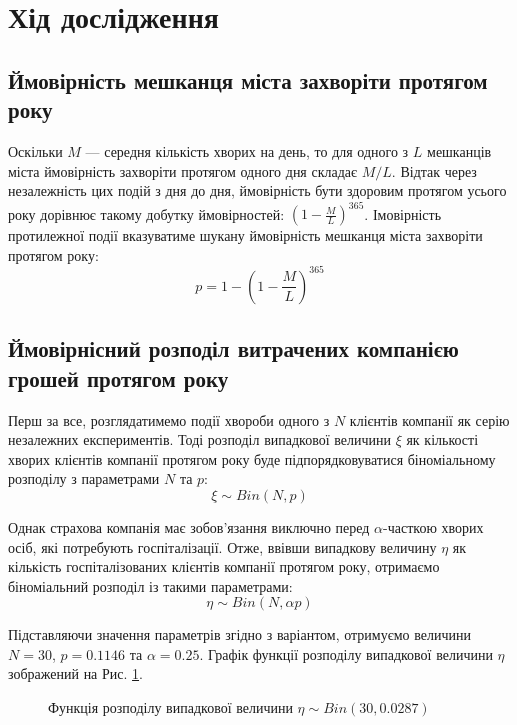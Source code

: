 \documentclass{mathreport}
\begin{document}
\section*{Хід дослідження}

\subsection{Ймовірність мешканця міста захворіти протягом року}

Оскільки $M$ --- середня кількість хворих на день, то для одного з $L$ мешканців міста ймовірність захворіти протягом одного дня складає $M/L$. Відтак через незалежність цих подій з дня до дня, ймовірність бути здоровим протягом усього року дорівнює такому добутку ймовірностей: $(1-\frac{M}{L})^{365}$. Імовірність протилежної події вказуватиме шукану ймовірність мешканця міста захворіти протягом року:
\begin{equation}\label{eq: p probability}
    p = 1-\left( 1-\frac{M}{L} \right)^{365}
\end{equation}

\subsection{Ймовірнісний розподіл витрачених компанією грошей протягом року}

Перш за все, розглядатимемо події хвороби одного з $N$ клієнтів компанії як серію незалежних експериментів. Тоді розподіл випадкової величини $\xi$ як кількості хворих клієнтів компанії протягом року буде підпорядковуватися біноміальному розподілу з параметрами $N$ та $p:$
\begin{equation}\label{eq: r.v. xi}
    \xi \sim Bin(N,p)
\end{equation}

Однак страхова компанія має зобов'язання виключно перед $\alpha$-часткою хворих осіб, які потребують госпіталізації. Отже, ввівши випадкову величину $\eta$ як кількість госпіталізованих клієнтів компанії протягом року, отримаємо біноміальний розподіл із такими параметрами:
\begin{equation}\label{eq: r.v. eta}
    \eta \sim Bin(N,\alpha p)
\end{equation}

Підставляючи значення параметрів згідно з варіантом, отримуємо величини $N=30$, $p=0.1146$ та $\alpha=0.25$. Графік функції розподілу випадкової величини $\eta$ зображений на Рис. \ref{pic: eta distribution}. 
\begin{figure}[H]\centering
    
    \caption{Функція розподілу випадкової величини $\eta \sim Bin(30,0.0287)$}
    \label{pic: eta distribution}
\end{figure}
\end{document}
